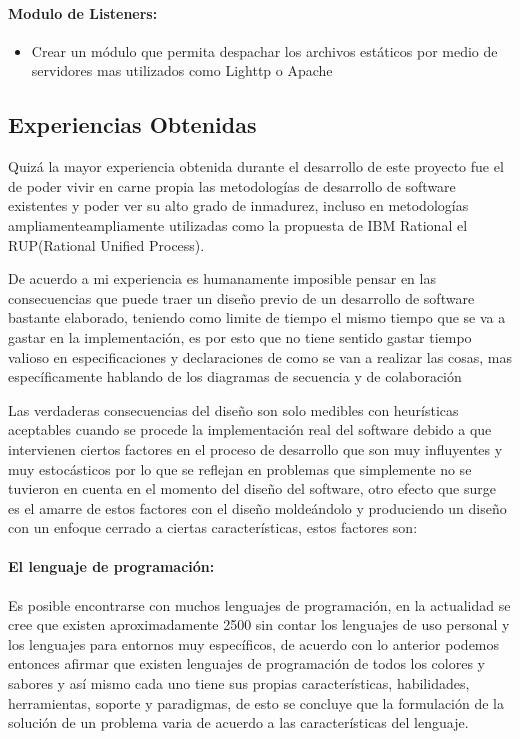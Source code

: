 \paragraph{Modulo de Listeners:}

\begin{itemize}
	\item Crear un módulo que permita despachar los archivos estáticos por medio de servidores mas utilizados como Lighttp \cite{lighttp} o Apache \cite{apache}
\end{itemize}


\subsection{Experiencias Obtenidas}

Quizá la mayor experiencia obtenida durante el desarrollo de este proyecto fue el de poder vivir en carne propia las metodologías de desarrollo de software existentes y poder ver su alto grado de inmadurez, incluso en metodologías ampliamenteampliamente utilizadas como la propuesta de IBM Rational el RUP(Rational Unified Process).

De acuerdo a mi experiencia es humanamente imposible pensar en las consecuencias que puede traer un diseño previo de un desarrollo de software bastante elaborado, teniendo como limite de tiempo el mismo tiempo que se va a gastar en la implementación, es por esto que no tiene sentido gastar tiempo valioso en especificaciones y declaraciones de como se van a realizar las cosas, mas específicamente hablando de los diagramas de secuencia y de colaboración

Las verdaderas consecuencias del diseño son solo medibles con heurísticas aceptables cuando se procede la implementación real del software debido a que intervienen ciertos factores en el proceso de desarrollo que son muy influyentes y muy estocásticos por lo que se reflejan en problemas que simplemente no se tuvieron en cuenta en el momento del diseño del software, otro efecto que surge es el amarre de estos factores con el diseño moldeándolo y produciendo un diseño con un enfoque cerrado a ciertas características, estos factores son:

\paragraph{El lenguaje de programación:}
Es posible encontrarse con muchos lenguajes de programación, en la actualidad se cree que existen aproximadamente 2500 \cite{bd_lenguajes_programacion} sin contar los lenguajes de uso personal y los lenguajes para entornos muy específicos, de acuerdo con lo anterior podemos entonces afirmar que existen lenguajes de programación de todos los colores y sabores y así mismo cada uno tiene sus propias características, habilidades, herramientas, soporte y paradigmas, de esto se concluye que la formulación de la solución de un problema varia de acuerdo a las características del lenguaje.


